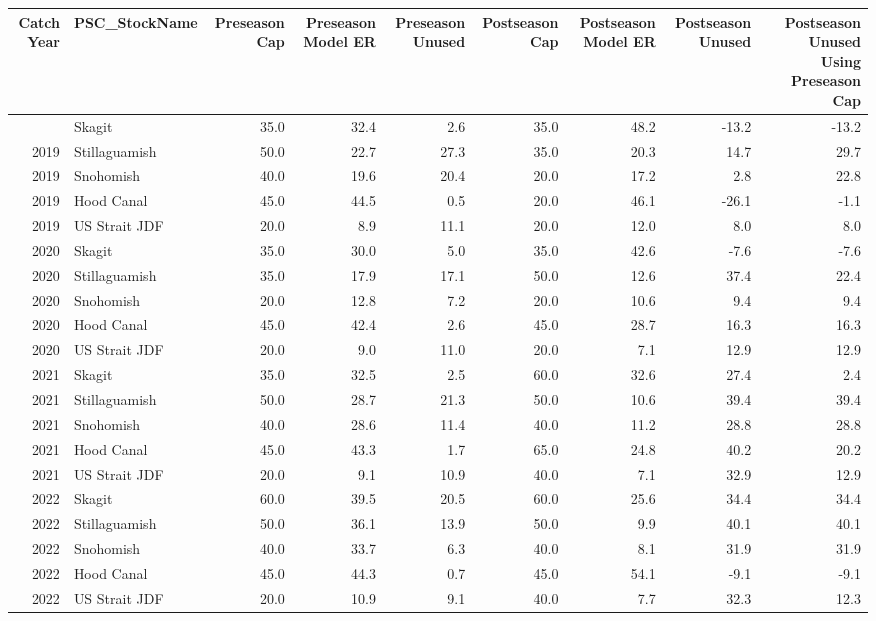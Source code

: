 \documentclass[
  letterpaper,
  DIV=11,
  numbers=noendperiod]{scrartcl}
\begin{document}
\begin{table}
\fontsize{12.0pt}{14.4pt}\selectfont
\begin{tabular*}{\linewidth}{@{\extracolsep{\fill}}rlrrrrrrr}
\toprule
Catch Year & PSC\_StockName & Preseason Cap & Preseason Model ER & Preseason Unused & Postseason Cap & Postseason Model ER & Postseason Unused & Postseason Unused Using Preseason Cap \\ 
\midrule\addlinespace[2.5pt]
2019 & Skagit & 35.0 & 32.4 & 2.6 & 35.0 & 48.2 & -13.2 & -13.2 \\ 
2019 & Stillaguamish & 50.0 & 22.7 & 27.3 & 35.0 & 20.3 & 14.7 & 29.7 \\ 
2019 & Snohomish & 40.0 & 19.6 & 20.4 & 20.0 & 17.2 & 2.8 & 22.8 \\ 
2019 & Hood Canal & 45.0 & 44.5 & 0.5 & 20.0 & 46.1 & -26.1 & -1.1 \\ 
2019 & US Strait JDF & 20.0 & 8.9 & 11.1 & 20.0 & 12.0 & 8.0 & 8.0 \\ 
2020 & Skagit & 35.0 & 30.0 & 5.0 & 35.0 & 42.6 & -7.6 & -7.6 \\ 
2020 & Stillaguamish & 35.0 & 17.9 & 17.1 & 50.0 & 12.6 & 37.4 & 22.4 \\ 
2020 & Snohomish & 20.0 & 12.8 & 7.2 & 20.0 & 10.6 & 9.4 & 9.4 \\ 
2020 & Hood Canal & 45.0 & 42.4 & 2.6 & 45.0 & 28.7 & 16.3 & 16.3 \\ 
2020 & US Strait JDF & 20.0 & 9.0 & 11.0 & 20.0 & 7.1 & 12.9 & 12.9 \\ 
2021 & Skagit & 35.0 & 32.5 & 2.5 & 60.0 & 32.6 & 27.4 & 2.4 \\ 
2021 & Stillaguamish & 50.0 & 28.7 & 21.3 & 50.0 & 10.6 & 39.4 & 39.4 \\ 
2021 & Snohomish & 40.0 & 28.6 & 11.4 & 40.0 & 11.2 & 28.8 & 28.8 \\ 
2021 & Hood Canal & 45.0 & 43.3 & 1.7 & 65.0 & 24.8 & 40.2 & 20.2 \\ 
2021 & US Strait JDF & 20.0 & 9.1 & 10.9 & 40.0 & 7.1 & 32.9 & 12.9 \\ 
2022 & Skagit & 60.0 & 39.5 & 20.5 & 60.0 & 25.6 & 34.4 & 34.4 \\ 
2022 & Stillaguamish & 50.0 & 36.1 & 13.9 & 50.0 & 9.9 & 40.1 & 40.1 \\ 
2022 & Snohomish & 40.0 & 33.7 & 6.3 & 40.0 & 8.1 & 31.9 & 31.9 \\ 
2022 & Hood Canal & 45.0 & 44.3 & 0.7 & 45.0 & 54.1 & -9.1 & -9.1 \\ 
2022 & US Strait JDF & 20.0 & 10.9 & 9.1 & 40.0 & 7.7 & 32.3 & 12.3 \\ 
\bottomrule
\end{tabular*}
\end{table}
\end{document}
